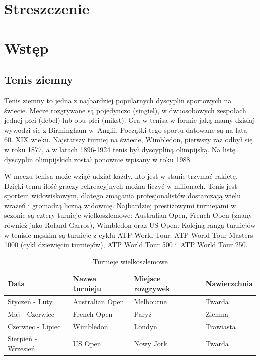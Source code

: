 


\maketitle
\tableofcontents

\chapter{Streszczenie}


\chapter{Wstęp}

\section{Tenis ziemny}
\label{Sec:Tenis}
Tenis ziemny to jedna z najbardziej popularnych dyscyplin sportowych na świecie. Mecze rozgrywane są pojedynczo (singiel), w dwuosobowych zespołach jednej płci (debel) lub obu płci (mikst). Gra w tenisa w formie jaką mamy dzisiaj wywodzi się z Birmingham w~Anglii. Początki tego sportu datowane są na lata 60. XIX wieku. Najstarszy turniej na świecie, Wimbledon, pierwszy raz odbył się w roku 1877, a w latach 1896-1924 tenis był dyscypliną olimpijską. Na listę dyscyplin olimpijskich został ponownie wpisany w roku 1988.\cite{tenis01}

W meczu tenisa może wziąć udział każdy, kto jest w stanie trzymać rakietę. Dzięki temu ilość graczy rekreacyjnych można liczyć w milionach. Tenis jest sportem widowiskowym, dlatego zmagania profesjonalistów dostarczają wielu wrażeń i gromadzą liczną widownię. Najbardziej prestiżowymi turniejami w sezonie są cztery turnieje wielkoszlemowe: Australian Open, French Open (znany również jako Roland Garros), Wimbledon oraz US Open. Kolejną rangą turniejów w tenisie męskim są turnieje z cyklu ATP World Tour: ATP World Tour Masters 1000 (cykl dziewięciu turniejów), ATP World Tour 500 i~ATP World Tour 250.\cite{tenis02}

\begin{table}[H]
\centering
\caption{Turnieje wielkoszlemowe\cite{tenis02}}
\label{Tab:Slam}
\begin{tabular}{|l|l|l|l|}
\hline
\textbf{Data}       & \textbf{Nazwa turnieju}     & \textbf{Miejsce rozgrywek} & \textbf{Nawierzchnia} \\ \hline
Styczeń - Luty      & Australian Open             & Melbourne                  & Twarda                \\ \hline
Maj - Czerwiec      & French Open  				  & Paryż                      & Ziemna                \\ \hline
Czerwiec - Lipiec   & Wimbledon                   & Londyn                     & Trawiasta             \\ \hline
Sierpień - Wrzesień & US Open                     & Nowy Jork                  & Twarda                \\ \hline
\end{tabular}
\end{table}

